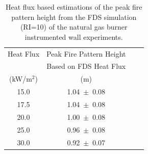 \documentclass[twoside]{uocthesis}
\begin{document}
{\begin{table}[h]
  \small
  \centering
  \begin{tabular}{|c|c|c|c|} \hline 
Heat Flux 		&  Peak Fire Pattern Height  	      		  \\
    			&  Based on FDS Heat Flux    	  	  	  \\
    (kW/m$^2$)			&  (m) 					 				   \\ 
\hline    15.0			&  1.04~$\pm$~0.08       		            \\
\hline    17.5			&  1.04~$\pm$~0.08							    \\
\hline    20.0			&  1.00~$\pm$~0.08								\\
\hline	  25.0			&  0.96~$\pm$~0.08							   	  \\
\hline    30.0   		&  0.92~$\pm$~0.07							\\  \hline
  \end{tabular}
  \caption[Heat flux based estimations of the peak fire pattern height from the FDS simulation (RI=10) of the natural gas burner instrumented wall experiments.]{Heat flux based estimations of the peak fire pattern height from the FDS simulation (RI=10) of the natural gas burner instrumented wall experiments.}
  \label{tab:FDS_CriticalHF_IWNG}
\end{table}


}
\end{document}
